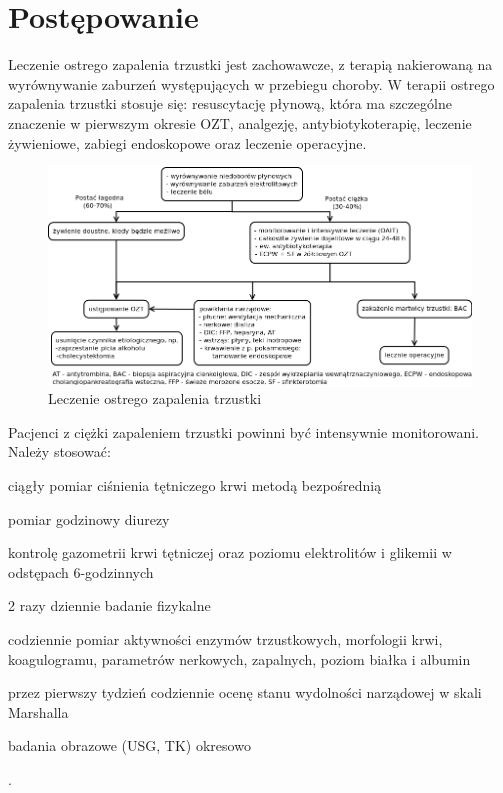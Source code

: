 \documentclass[a4paper, 12pt]{report}
\begin{document}
\chapter{Postępowanie}

Leczenie ostrego zapalenia trzustki jest zachowawcze, z terapią
nakierowaną na wyrównywanie zaburzeń występujących w przebiegu
choroby. W terapii ostrego zapalenia trzustki stosuje się:
resuscytację płynową, która ma szczególne znaczenie w pierwszym
okresie OZT, analgezję, antybiotykoterapię, leczenie żywieniowe,
zabiegi endoskopowe oraz leczenie operacyjne.

\begin{figure}[!h]
\centering
\includegraphics[scale=0.4]{pan_ter}
\caption{Leczenie ostrego zapalenia trzustki}
\end{figure}

Pacjenci z ciężki zapaleniem trzustki powinni być intensywnie
monitorowani. Należy stosować:  
\begin{inparaenum}
\item ciągły pomiar ciśnienia tętniczego krwi metodą bezpośrednią
\item pomiar godzinowy diurezy
\item kontrolę gazometrii krwi tętniczej oraz poziomu elektrolitów i
  glikemii w odstępach 6-godzinnych
\item 2 razy dziennie badanie fizykalne
\item codziennie pomiar aktywności enzymów trzustkowych, morfologii
  krwi, koagulogramu, parametrów nerkowych, zapalnych, poziom białka i
  albumin
\item przez pierwszy tydzień codziennie ocenę stanu wydolności
  narządowej w skali Marshalla
\item badania obrazowe (USG, TK) okresowo
\end{inparaenum}. 
\end{document}
